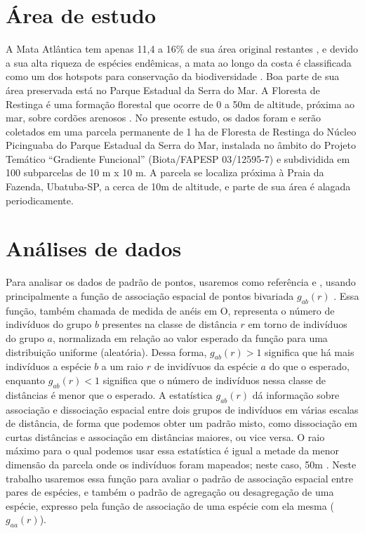 \documentclass[twoside,12pt,a4paper]{report}
\begin{document}
\section{Área de estudo}
A Mata Atlântica tem apenas 11,4 a 16\% de sua área original restantes \citep{Ribeiro2009}, e
devido a sua alta riqueza de espécies endêmicas, a mata ao longo da costa é classificada como um dos
hotspots para conservação da biodiversidade \citep{Myers2000}. Boa parte de sua área preservada
está no Parque Estadual da Serra do Mar. A Floresta de Restinga é uma formação florestal que ocorre
de 0 a 50m de altitude, próxima ao mar, sobre cordões arenosos \citep{Joly2008}. No presente
estudo, os dados foram e serão coletados em uma parcela permanente de 1 ha de Floresta de Restinga
do Núcleo Picinguaba do Parque Estadual da Serra do Mar, instalada no âmbito do Projeto Temático
“Gradiente Funcional” (Biota/FAPESP 03/12595-7) e subdividida em 100 subparcelas de 10 m x 10 m. A
parcela se localiza próxima à Praia da Fazenda, Ubatuba-SP, a cerca de 10m de altitude, e parte de
sua área é alagada periodicamente.



\section{Análises de dados}

Para analisar os dados de padrão de pontos, usaremos como referência \citep{IllianBook} e
\citep{WiegandBook}, usando principalmente a função de associação espacial de pontos bivariada
$g_{ab}(r)$ \citep{IllianBook,WiegandBook,Stoyan1994}. Essa função, também chamada de medida de
anéis em O, representa o número de indivíduos do grupo $b$ presentes na classe de distância $r$ em
torno de indivíduos do grupo $a$, normalizada em relação ao valor esperado da função para uma
distribuição uniforme (aleatória). Dessa forma, $g_{ab}(r) > 1$ significa que há mais indivíduos a
espécie $b$ a um raio $r$ de invidívuos da espécie $a$ do que o esperado,
enquanto $g_{ab}(r) < 1 $ significa que o número de indivíduos nessa classe de distâncias é menor
que o esperado. A estatística $g_{ab}(r)$ dá informação sobre associação e dissociação espacial
entre dois grupos de indivíduos em várias escalas de distância, de forma que podemos obter um padrão
misto, como dissociação em curtas distâncias e associação em distâncias maiores, ou vice versa. O
raio máximo para o qual podemos usar essa estatística é igual a metade da menor dimensão da parcela
onde os indivíduos foram mapeados; neste caso, 50m \citep{IllianBook}. Neste trabalho usaremos essa
função para avaliar o padrão de associação espacial entre pares de espécies, e também o padrão de
agregação ou desagregação de uma espécie, expresso pela função de associação de uma espécie com ela
mesma ($g_{aa}(r)$).
\end{document}
